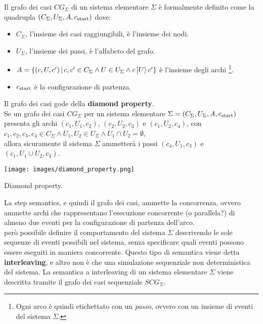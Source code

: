 \begin{defn}
    Il grafo dei casi $CG_{\Sigma}$ di un sistema elementare $\Sigma$ è formalmente definito come la quadrupla $(C_{\Sigma}, U_{\Sigma}, A, c_{\textnormal{start}})$ dove:
    \begin{itemize}
        \item $C_{\Sigma}$, l'insieme dei casi raggiungibili, è l'insieme dei nodi.
        \item $U_{\Sigma}$, l'insieme dei passi, è l'alfabeto del grafo.
        \item $A = \left\{(c, U, c') \, | \, c, c' \in C_{\Sigma} \land U \in U_{\Sigma} \land c\,[U\rangle\,c'\right\}$ è l'insieme degli archi \footnote{Ogni arco è quindi etichettato con un \textit{passo}, ovvero con un insieme di eventi del sistema $\Sigma$.}.
        \item $c_{\textnormal{start}}$ è la configurazione di partenza.
    \end{itemize}
\end{defn}

\begin{property}
    Il grafo dei casi gode della \textbf{diamond property}.\\
    Se un grafo dei casi $CG_{\Sigma}$ per un sistema elementare $\Sigma = (C_{\Sigma}, U_{\Sigma}, A, c_{\textnormal{start}})$ presenta gli archi $(c_1, U_1, c_2)$, $(c_2, U_2, c_3)$ e $(c_1, U_2, c_4)$, con $c_1, c_2, c_3, c_4 \in C_{\Sigma} \land U_1, U_2 \in U_{\Sigma} \land U_1 \cap U_2 = \emptyset$,\\
    allora sicuramente il sistema $\Sigma$ ammetterà i passi $(c_4, U_1, c_3)$ e $(c_1, U_1 \cup U_2, c_3)$.
    \begin{marginfigure}[1cm]
        \texttt{[image: images/diamond\_property.png]}
        \caption{Diamond property.}
        \label{fig:diamond_property}
    \end{marginfigure}
\end{property}
La step semantics, e quindi il grafo dei casi, ammette la concorrenza, ovvero ammette archi che rappresentano l'esecuzione concorrente (o parallela?) di almeno due eventi per la configurazione di partenza dell'arco.\\
\upperAccE però possibile definire il comportamento del sistema $\Sigma$ descrivendo le sole sequenze di eventi possibili nel sistema, senza specificare quali eventi possono essere eseguiti in maniera concorrente. Questo tipo di semantica viene detta \textbf{interleaving}, e altro non è che una simulazione sequenziale non deterministica del sistema. La semantica a interleaving di un sistema elementare $\Sigma$ viene descritta tramite il grafo dei casi sequenziale $SCG_{\Sigma}$.

